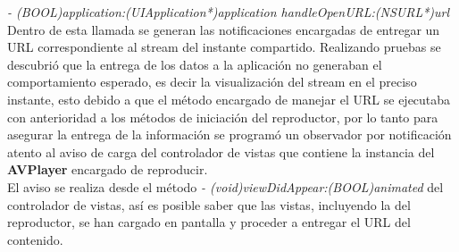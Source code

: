 \textit{- (BOOL)application:(UIApplication*)application handleOpenURL:(NSURL*)url}\\

Dentro de esta llamada se generan las notificaciones encargadas de entregar un URL correspondiente al stream del instante compartido. Realizando pruebas se descubrió que la entrega de los datos a la aplicación no generaban el comportamiento esperado, es decir la visualización del stream en el preciso instante, esto debido a que el método encargado de manejar el URL se ejecutaba con anterioridad a los métodos de iniciación del reproductor, por lo tanto para asegurar la entrega de la información se programó un observador por notificación \cite{bib:ios-nsnotificationcenter} atento al aviso de carga del controlador de vistas que contiene la instancia del \textbf{AVPlayer} encargado de reproducir. \\

El aviso se realiza desde el método \textit{- (void)viewDidAppear:(BOOL)animated} del controlador de vistas, así es posible saber que las vistas, incluyendo la del reproductor, se han cargado en pantalla y proceder a entregar el URL del contenido.


